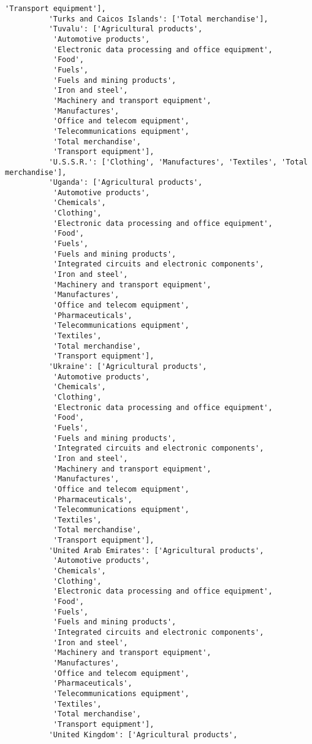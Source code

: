\documentclass[11pt]{article}
\begin{document}
\begin{Verbatim}[commandchars=\\\{\}]
           'Transport equipment'],
          'Turks and Caicos Islands': ['Total merchandise'],
          'Tuvalu': ['Agricultural products',
           'Automotive products',
           'Electronic data processing and office equipment',
           'Food',
           'Fuels',
           'Fuels and mining products',
           'Iron and steel',
           'Machinery and transport equipment',
           'Manufactures',
           'Office and telecom equipment',
           'Telecommunications equipment',
           'Total merchandise',
           'Transport equipment'],
          'U.S.S.R.': ['Clothing', 'Manufactures', 'Textiles', 'Total merchandise'],
          'Uganda': ['Agricultural products',
           'Automotive products',
           'Chemicals',
           'Clothing',
           'Electronic data processing and office equipment',
           'Food',
           'Fuels',
           'Fuels and mining products',
           'Integrated circuits and electronic components',
           'Iron and steel',
           'Machinery and transport equipment',
           'Manufactures',
           'Office and telecom equipment',
           'Pharmaceuticals',
           'Telecommunications equipment',
           'Textiles',
           'Total merchandise',
           'Transport equipment'],
          'Ukraine': ['Agricultural products',
           'Automotive products',
           'Chemicals',
           'Clothing',
           'Electronic data processing and office equipment',
           'Food',
           'Fuels',
           'Fuels and mining products',
           'Integrated circuits and electronic components',
           'Iron and steel',
           'Machinery and transport equipment',
           'Manufactures',
           'Office and telecom equipment',
           'Pharmaceuticals',
           'Telecommunications equipment',
           'Textiles',
           'Total merchandise',
           'Transport equipment'],
          'United Arab Emirates': ['Agricultural products',
           'Automotive products',
           'Chemicals',
           'Clothing',
           'Electronic data processing and office equipment',
           'Food',
           'Fuels',
           'Fuels and mining products',
           'Integrated circuits and electronic components',
           'Iron and steel',
           'Machinery and transport equipment',
           'Manufactures',
           'Office and telecom equipment',
           'Pharmaceuticals',
           'Telecommunications equipment',
           'Textiles',
           'Total merchandise',
           'Transport equipment'],
          'United Kingdom': ['Agricultural products',

\end{Verbatim}
\end{document}
